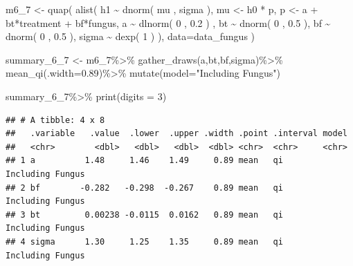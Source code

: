 \documentclass[
]{book}
\newenvironment{Shaded}{\begin{snugshade}}{\end{snugshade}}
\newcommand{\AttributeTok}[1]{\textcolor[rgb]{0.77,0.63,0.00}{#1}}
\newcommand{\DecValTok}[1]{\textcolor[rgb]{0.00,0.00,0.81}{#1}}
\newcommand{\FloatTok}[1]{\textcolor[rgb]{0.00,0.00,0.81}{#1}}
\newcommand{\FunctionTok}[1]{\textcolor[rgb]{0.00,0.00,0.00}{#1}}
\newcommand{\NormalTok}[1]{#1}
\newcommand{\OtherTok}[1]{\textcolor[rgb]{0.56,0.35,0.01}{#1}}
\newcommand{\SpecialCharTok}[1]{\textcolor[rgb]{0.00,0.00,0.00}{#1}}
\newcommand{\StringTok}[1]{\textcolor[rgb]{0.31,0.60,0.02}{#1}}
\begin{document}
\begin{Shaded}
\begin{Highlighting}[]
\NormalTok{m6\_7 }\OtherTok{\textless{}{-}} \FunctionTok{quap}\NormalTok{( }\FunctionTok{alist}\NormalTok{( }
\NormalTok{  h1 }\SpecialCharTok{\textasciitilde{}} \FunctionTok{dnorm}\NormalTok{( mu , sigma ), }
\NormalTok{  mu }\OtherTok{\textless{}{-}}\NormalTok{ h0 }\SpecialCharTok{*}\NormalTok{ p, }
\NormalTok{  p }\OtherTok{\textless{}{-}}\NormalTok{ a }\SpecialCharTok{+}\NormalTok{ bt}\SpecialCharTok{*}\NormalTok{treatment }\SpecialCharTok{+}\NormalTok{ bf}\SpecialCharTok{*}\NormalTok{fungus, }
\NormalTok{  a }\SpecialCharTok{\textasciitilde{}} \FunctionTok{dlnorm}\NormalTok{( }\DecValTok{0}\NormalTok{ , }\FloatTok{0.2}\NormalTok{ ) , }
\NormalTok{  bt }\SpecialCharTok{\textasciitilde{}} \FunctionTok{dnorm}\NormalTok{( }\DecValTok{0}\NormalTok{ , }\FloatTok{0.5}\NormalTok{ ), }
\NormalTok{  bf }\SpecialCharTok{\textasciitilde{}} \FunctionTok{dnorm}\NormalTok{( }\DecValTok{0}\NormalTok{ , }\FloatTok{0.5}\NormalTok{ ), }
\NormalTok{  sigma }\SpecialCharTok{\textasciitilde{}} \FunctionTok{dexp}\NormalTok{( }\DecValTok{1}\NormalTok{ )}
\NormalTok{), }\AttributeTok{data=}\NormalTok{data\_fungus )}

\NormalTok{summary\_6\_7 }\OtherTok{\textless{}{-}}\NormalTok{ m6\_7}\SpecialCharTok{\%\textgreater{}\%}
  \FunctionTok{gather\_draws}\NormalTok{(a,bt,bf,sigma)}\SpecialCharTok{\%\textgreater{}\%}
  \FunctionTok{mean\_qi}\NormalTok{(}\AttributeTok{.width=}\FloatTok{0.89}\NormalTok{)}\SpecialCharTok{\%\textgreater{}\%}
  \FunctionTok{mutate}\NormalTok{(}\AttributeTok{model=}\StringTok{"Including Fungus"}\NormalTok{)}

\NormalTok{summary\_6\_7}\SpecialCharTok{\%\textgreater{}\%}
  \FunctionTok{print}\NormalTok{(}\AttributeTok{digits =} \DecValTok{3}\NormalTok{)}
\end{Highlighting}
\end{Shaded}

\begin{verbatim}
## # A tibble: 4 x 8
##   .variable   .value  .lower  .upper .width .point .interval model           
##   <chr>        <dbl>   <dbl>   <dbl>  <dbl> <chr>  <chr>     <chr>           
## 1 a          1.48     1.46    1.49     0.89 mean   qi        Including Fungus
## 2 bf        -0.282   -0.298  -0.267    0.89 mean   qi        Including Fungus
## 3 bt         0.00238 -0.0115  0.0162   0.89 mean   qi        Including Fungus
## 4 sigma      1.30     1.25    1.35     0.89 mean   qi        Including Fungus
\end{verbatim}
\end{document}
